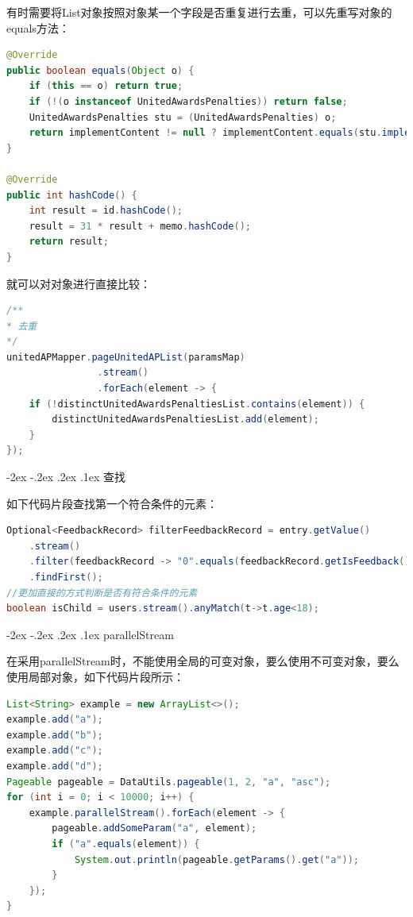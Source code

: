 \documentclass[12pt]{book}
\makeatletter
\numberwithin{dummy}{section}
\theoremstyle{ocrenumbox}
\theoremstyle{blacknumex}
\theoremstyle{blacknumbox}
\theoremstyle{ocrenum}
\renewcommand\paragraph{\@startsection{paragraph}{4}{\z@}
	{-2ex \@plus-.2ex \@minus .2ex}
	{.1ex}
	{\normalfont\small\sffamily\bfseries}}
\makeatother
\begin{document}
有时需要将List对象按照对象某一个字段是否重复进行去重，可以先重写对象的equals方法：


\begin{lstlisting}[language=Java]
@Override
public boolean equals(Object o) {
	if (this == o) return true;
	if (!(o instanceof UnitedAwardsPenalties)) return false;
	UnitedAwardsPenalties stu = (UnitedAwardsPenalties) o;
	return implementContent != null ? implementContent.equals(stu.implementContent) : stu.implementContent == null;
}

@Override
public int hashCode() {
	int result = id.hashCode();
	result = 31 * result + memo.hashCode();
	return result;
}
\end{lstlisting}

就可以对对象进行直接比较：

\begin{lstlisting}[language=Java]
/**
* 去重
*/
unitedAPMapper.pageUnitedAPList(paramsMap)
				.stream()
				.forEach(element -> {
	if (!distinctUnitedAwardsPenaltiesList.contains(element)) {
		distinctUnitedAwardsPenaltiesList.add(element);
	}
});
\end{lstlisting}


\paragraph{查找}

如下代码片段查找第一个符合条件的元素：

\begin{lstlisting}[language=Java]
Optional<FeedbackRecord> filterFeedbackRecord = entry.getValue()
	.stream()
	.filter(feedbackRecord -> "0".equals(feedbackRecord.getIsFeedback()))
	.findFirst();
//更加直接的方式判断是否有符合条件的元素
boolean isChild = users.stream().anyMatch(t->t.age<18);
\end{lstlisting}

\paragraph{parallelStream}

在采用parallelStream时，不能使用全局的可变对象，要么使用不可变对象，要么使用局部对象，如下代码片段所示：

\begin{lstlisting}[language=Java]
List<String> example = new ArrayList<>();
example.add("a");
example.add("b");
example.add("c");
example.add("d");
Pageable pageable = DataUtils.pageable(1, 2, "a", "asc");
for (int i = 0; i < 10000; i++) {
	example.parallelStream().forEach(element -> {
		pageable.addSomeParam("a", element);
		if ("a".equals(element)) {
			System.out.println(pageable.getParams().get("a"));
		}
	});
}
\end{lstlisting}
\end{document}
